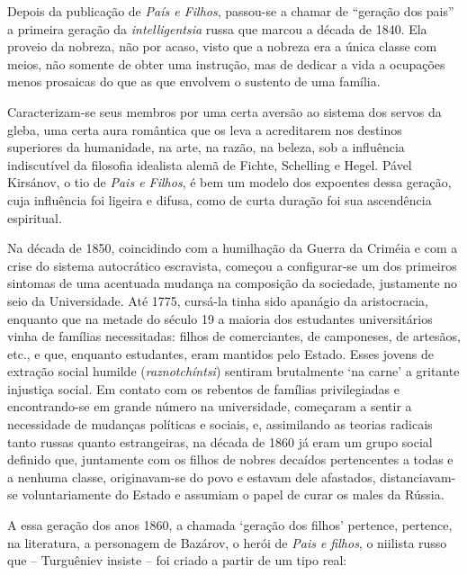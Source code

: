 Depois da publicação de \emph{País e Filhos}, passou-se a chamar de
``geração dos pais'' a primeira geração da \emph{intelligentsia} russa
que marcou a década de 1840. Ela proveio da nobreza, não por acaso,
visto que a nobreza era a única classe com meios, não somente de obter
uma instrução, mas de dedicar a vida a ocupações menos prosaicas do que
as que envolvem o sustento de uma família.

Caracterizam-se seus membros por uma certa aversão ao sistema dos servos
da gleba, uma certa aura romântica que os leva a acreditarem nos
destinos superiores da humanidade, na arte, na razão, na beleza, sob a
influência indiscutível da filosofia idealista alemã de Fichte,
Schelling e Hegel. Pável Kirsánov, o tio de \emph{Pais e Filhos}, é bem
um modelo dos expoentes dessa geração, cuja influência foi ligeira e
difusa, como de curta duração foi sua ascendência espiritual.

Na década de 1850, coincidindo com a humilhação da Guerra da Criméia e
com a crise do sistema autocrático escravista, começou a configurar-se
um dos primeiros sintomas de uma acentuada mudança na composição da
sociedade, justamente no seio da Universidade. Até 1775, cursá-la tinha
sido apanágio da aristocracia, enquanto que na metade do século 19 a
maioria dos estudantes universitários vinha de famílias necessitadas:
filhos de comerciantes, de camponeses, de artesãos, etc., e que,
enquanto estudantes, eram mantidos pelo Estado. Esses jovens de extração
social humilde (\emph{raznotchíntsi}) sentiram brutalmente `na carne' a
gritante injustiça social. Em contato com os rebentos de famílias
privilegiadas e encontrando-se em grande número na universidade,
começaram a sentir a necessidade de mudanças políticas e sociais, e,
assimilando as teorias radicais tanto russas quanto estrangeiras, na
década de 1860 já eram um grupo social definido que, juntamente com os
filhos de nobres decaídos pertencentes a todas e a nenhuma classe,
originavam-se do povo e estavam dele afastados, distanciavam-se
voluntariamente do Estado e assumiam o papel de curar os males da
Rússia.

A essa geração dos anos 1860, a chamada `geração dos filhos' pertence,
pertence, na literatura, a personagem de Bazárov, o herói de \emph{Pais
e filhos}, o niilista russo que -- Turguêniev insiste -- foi criado a
partir de um tipo real:

